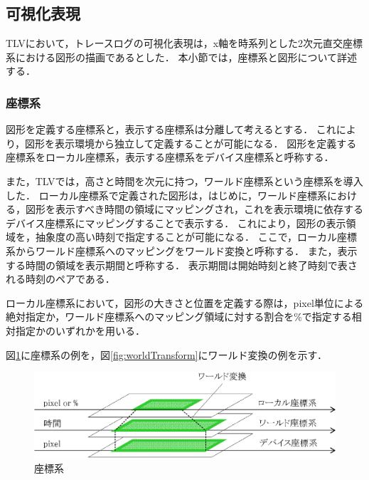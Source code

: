 \subsection{可視化表現}
\label{subsec:visualization}

TLVにおいて，トレースログの可視化表現は，x軸を時系列とした2次元直交座標系における図形の描画であるとした．
本小節では，座標系と図形について詳述する．

\subsubsection{座標系}

図形を定義する座標系と，表示する座標系は分離して考えるとする．
これにより，図形を表示環境から独立して定義することが可能になる．
図形を定義する座標系をローカル座標系，表示する座標系をデバイス座標系と呼称する．

また，TLVでは，高さと時間を次元に持つ，ワールド座標系という座標系を導入した．
ローカル座標系で定義された図形は，はじめに，ワールド座標系における，図形を表示すべき時間の領域にマッピングされ，これを表示環境に依存するデバイス座標系にマッピングすることで表示する．
これにより，図形の表示領域を，抽象度の高い時刻で指定することが可能になる．
ここで，ローカル座標系からワールド座標系へのマッピングをワールド変換と呼称する．
また，表示する時間の領域を表示期間と呼称する．
表示期間は開始時刻と終了時刻で表される時刻のペアである．

ローカル座標系において，図形の大きさと位置を定義する際は，pixel単位による絶対指定か，ワールド座標系へのマッピング領域に対する割合を\%で指定する相対指定かのいずれかを用いる．

図\ref{fig:coordinate}に座標系の例を，図\ref{fig:worldTransform}にワールド変換の例を示す．

\begin{figure}[tb]
\begin{center}
\includegraphics[scale=0.75]{img/coordinate.eps}
\caption{座標系}
\label{fig:coordinate}
\end{center}
\end{figure}

